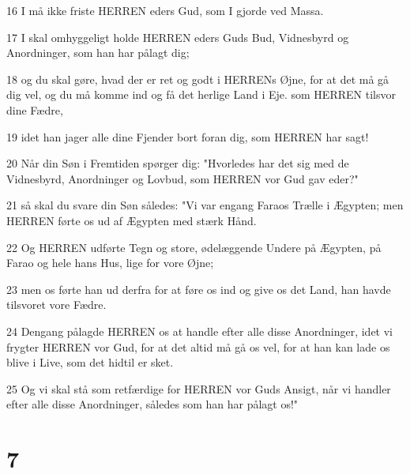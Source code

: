 \par 16 I må ikke friste HERREN eders Gud, som I gjorde ved Massa.
\par 17 I skal omhyggeligt holde HERREN eders Guds Bud, Vidnesbyrd og Anordninger, som han har pålagt dig;
\par 18 og du skal gøre, hvad der er ret og godt i HERRENs Øjne, for at det må gå dig vel, og du må komme ind og få det herlige Land i Eje. som HERREN tilsvor dine Fædre,
\par 19 idet han jager alle dine Fjender bort foran dig, som HERREN har sagt!
\par 20 Når din Søn i Fremtiden spørger dig: "Hvorledes har det sig med de Vidnesbyrd, Anordninger og Lovbud, som HERREN vor Gud gav eder?"
\par 21 så skal du svare din Søn således: "Vi var engang Faraos Trælle i Ægypten; men HERREN førte os ud af Ægypten med stærk Hånd.
\par 22 Og HERREN udførte Tegn og store, ødelæggende Undere på Ægypten, på Farao og hele hans Hus, lige for vore Øjne;
\par 23 men os førte han ud derfra for at føre os ind og give os det Land, han havde tilsvoret vore Fædre.
\par 24 Dengang pålagde HERREN os at handle efter alle disse Anordninger, idet vi frygter HERREN vor Gud, for at det altid må gå os vel, for at han kan lade os blive i Live, som det hidtil er sket.
\par 25 Og vi skal stå som retfærdige for HERREN vor Guds Ansigt, når vi handler efter alle disse Anordninger, således som han har pålagt os!"

\chapter{7}

